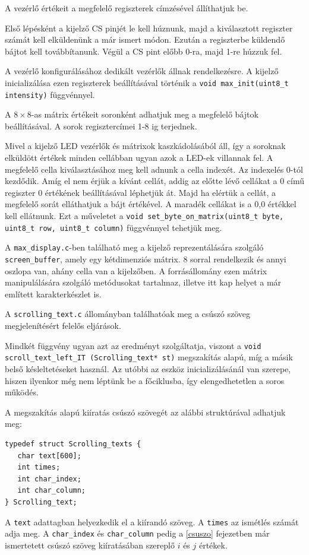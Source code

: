 \documentclass[a4paper, 12pt]{article}
\begin{document}
A vezérlő értékeit a megfelelő regiszterek címzésével állíthatjuk be.

Első lépésként a kijelző CS pinjét le kell húznunk, majd a kiválasztott regiszter számát kell elküldenünk a már ismert módon. Ezután a regiszterbe küldendő bájtot kell továbbítanunk. Végül a CS pint előbb 0-ra, majd 1-re húzzuk fel.

A vezérlő konfigurálásához dedikált vezérlők állnak rendelkezésre. A kijelző inicializálása ezen regiszterek beállításával történik a \texttt{void max\_init(uint8\_t intensity)} függvénnyel.

A $8\times 8$-as mátrix értékeit soronként adhatjuk meg a megfelelő bájtok beállításával. A sorok regisztercímei 1-8 ig terjednek.

Mivel a kijelző LED vezérlők és mátrixok kaszkádolásából áll, így a soroknak elküldött értékek minden cellábban ugyan azok a LED-ek villannak fel. A megfelelő cella kiválasztásához meg kell adnunk a cella indexét. Az indexelés 0-tól kezdődik. Amíg el nem érjük a kívánt cellát, addig az előtte lévő cellákat a 0 című regiszter 0 értékének beállításával léphetjük át. Majd ha elértük a cellát, a megfelelő sorát elláthatjuk a bájt értékével. A maradék cellákat is a 0,0 értékkel kell ellátnunk. Ezt a műveletet a \texttt{void set\_byte\_on\_matrix(uint8\_t byte, uint8\_t row, uint8\_t column)} függvénnyel tehetjük meg.

\bigskip

A \texttt{max\_display.c}-ben található meg a kijelző reprezentálására szolgáló \texttt{screen\_buffer}, amely egy kétdimenziós mátrix. 8 sorral rendelkezik és annyi oszlopa van, ahány cella van a kijelzőben.
A forrásállomány ezen mátrix manipulálására szolgáló metódusokat tartalmaz, illetve itt kap helyet a már említett karakterkészlet is.

\bigskip

A \texttt{scrolling\_text.c} állományban találhatóak meg a csúszó szöveg megjelenítésért felelős eljárások.

\noindent Mindkét függvény ugyan azt az eredményt szolgáltatja, viszont a \texttt{void scroll\_text\_left\_IT (Scrolling\_text* st)} megszakítás alapú, míg a másik belső késleltetéseket használ. Az utóbbi az eszköz inicializálásánál van szerepe, hiszen ilyenkor még nem léptünk be a főciklusba, így elengedhetetlen a soros működés.

A megszakítás alapú kiíratás csúszó szövegét az alábbi struktúrával adhatjuk meg:
\begin{lstlisting}[style=CStyle]
typedef struct Scrolling_texts {
   char text[600];
   int times;
   int char_index;
   int char_column;
} Scrolling_text;
\end{lstlisting}
A \texttt{text} adattagban helyezkedik el a kiírandó szöveg. A \texttt{times} az ismétlés számát adja meg. A \texttt{char\_index} és \texttt{char\_column} pedig a \ref{csuszo} fejezetben már ismertetett csúszó szöveg kiíratásában szereplő $i$ és $j$ értékek. 
\end{document}

